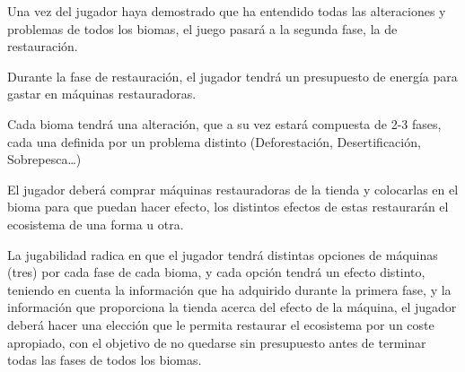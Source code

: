 Una vez del jugador haya demostrado que ha entendido todas las alteraciones y problemas de todos los biomas, el juego pasará a la segunda fase, la de restauración.
\begin{compactitem}
    \item Durante la fase de restauración, el jugador tendrá un presupuesto de energía para gastar en máquinas restauradoras.
    \item Cada bioma tendrá una alteración, que a su vez estará compuesta de 2-3 fases, cada una definida por un problema distinto (Deforestación, Desertificación, Sobrepesca…)
    \item El jugador deberá comprar máquinas restauradoras de la tienda y colocarlas en el bioma para que puedan hacer efecto, los distintos efectos de estas restaurarán el ecosistema de una forma u otra.
    \item La jugabilidad radica en que el jugador tendrá distintas opciones de máquinas (tres) por cada fase de cada bioma, y cada opción tendrá un efecto distinto, teniendo en cuenta la información que ha adquirido durante la primera fase, y la información que proporciona la tienda acerca del efecto de la máquina, el jugador deberá hacer una elección que le permita restaurar el ecosistema por un coste apropiado, con el objetivo de no quedarse sin presupuesto antes de terminar todas las fases de todos los biomas.
\end{compactitem}

